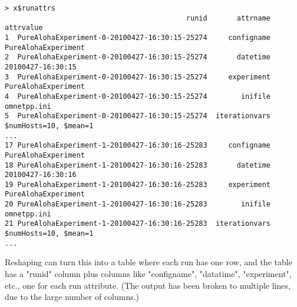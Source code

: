 \begin{verbatim}
> x$runattrs
                                           runid       attrname                               attrvalue
1  PureAlohaExperiment-0-20100427-16:30:15-25274     configname                     PureAlohaExperiment
2  PureAlohaExperiment-0-20100427-16:30:15-25274       datetime                       20100427-16:30:15
3  PureAlohaExperiment-0-20100427-16:30:15-25274     experiment                     PureAlohaExperiment
4  PureAlohaExperiment-0-20100427-16:30:15-25274        inifile                             omnetpp.ini
5  PureAlohaExperiment-0-20100427-16:30:15-25274  iterationvars                   $numHosts=10, $mean=1
...
17 PureAlohaExperiment-1-20100427-16:30:16-25283     configname                     PureAlohaExperiment
18 PureAlohaExperiment-1-20100427-16:30:16-25283       datetime                       20100427-16:30:16
19 PureAlohaExperiment-1-20100427-16:30:16-25283     experiment                     PureAlohaExperiment
20 PureAlohaExperiment-1-20100427-16:30:16-25283        inifile                             omnetpp.ini
21 PureAlohaExperiment-1-20100427-16:30:16-25283  iterationvars                   $numHosts=10, $mean=1
...
\end{verbatim}

Reshaping can turn this into a table where each run has one row, and the table has
a "runid" column plus columns like "configname", "datatime", "experiment", etc.,
one for each run attribute. (The output has been broken to multiple lines, due to the 
large number of columns.)

